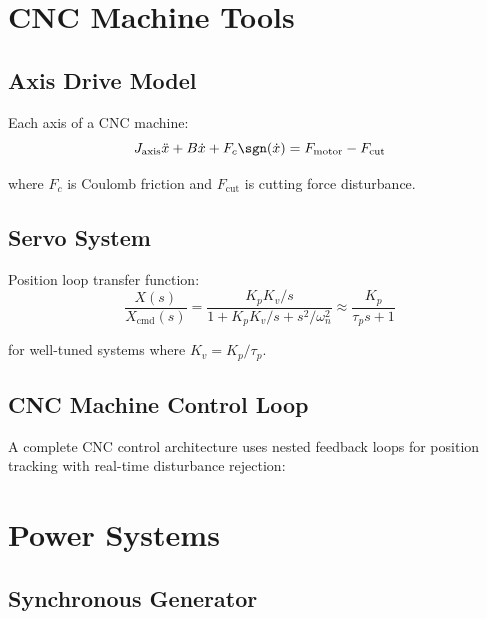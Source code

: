 \section{CNC Machine Tools}
\label{sec:cnc}

\subsection{Axis Drive Model}

Each axis of a CNC machine:
\begin{equation}
J_{\text{axis}}\ddot{x} + B\dot{x} + F_c\sgn(\dot{x}) = F_{\text{motor}} - F_{\text{cut}}
\end{equation}

where $F_c$ is Coulomb friction and $F_{\text{cut}}$ is cutting force disturbance.

\subsection{Servo System}

Position loop transfer function:
\begin{equation}
\frac{X(s)}{X_{\text{cmd}}(s)} = \frac{K_p K_v/s}{1 + K_p K_v/s + s^2/\omega_n^2} \approx \frac{K_p}{\tau_p s + 1}
\end{equation}

for well-tuned systems where $K_v = K_p/\tau_p$.

\subsection{CNC Machine Control Loop}

A complete CNC control architecture uses nested feedback loops for position tracking with real-time disturbance rejection:



\section{Power Systems}
\label{sec:power_systems}

\subsection{Synchronous Generator}

